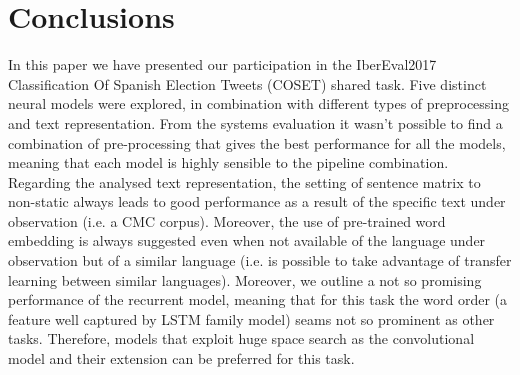 \section{Conclusions} \label{sec:conclusion}

In this paper we have presented our participation in the IberEval2017 Classification Of Spanish Election Tweets (COSET) shared task. Five distinct neural models were explored, in combination with different types of preprocessing and text representation.
From the systems evaluation it wasn't possible to find a combination of pre-processing that gives the best performance for all the models, meaning that each model is highly sensible to the pipeline combination.
Regarding the analysed text representation, the setting of sentence matrix to non-static always leads to good performance as a result of the specific text under observation (i.e. a CMC corpus). Moreover, the use of pre-trained word embedding is always suggested even when not available of the language under observation but of a similar language (i.e. is possible to take advantage of transfer learning between similar languages).
Moreover, we outline a not so promising performance of the recurrent model, meaning that for this task the word order (a feature well captured by LSTM family model) seams not so prominent as other tasks. Therefore, models that exploit huge space search as the convolutional model and their extension can be preferred for this task.